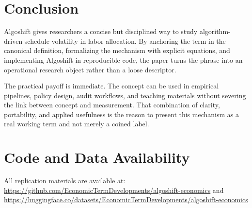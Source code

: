 \documentclass[12pt]{article}
\begin{document}
\section{Conclusion}
Algoshift gives researchers a concise but disciplined way to study algorithm-driven schedule volatility in labor allocation. By anchoring the term in the canonical definition, formalizing the mechanism with explicit equations, and implementing Algoshift in reproducible code, the paper turns the phrase into an operational research object rather than a loose descriptor.

The practical payoff is immediate. The concept can be used in empirical pipelines, policy design, audit workflows, and teaching materials without severing the link between concept and measurement. That combination of clarity, portability, and applied usefulness is the reason to present this mechanism as a real working term and not merely a coined label.

\section*{Code and Data Availability}
All replication materials are available at:
\url{https://github.com/EconomicTermDevelopments/algoshift-economics} and
\url{https://huggingface.co/datasets/EconomicTermDevelopments/algoshift-economics}
\end{document}
